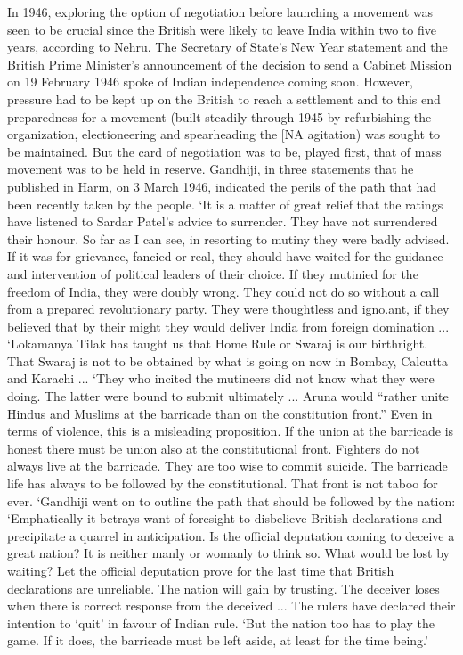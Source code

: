 In 1946, exploring the option of negotiation before launching a movement was seen to be crucial since the British were likely to leave India within two to five years, according to Nehru. The Secretary of State's New Year statement and the British Prime Minister's announcement of the decision to send a Cabinet Mission on 19 February 1946 spoke of Indian independence coming soon. However, pressure had to be kept up on the British to reach a settlement and to this end preparedness for a movement (built steadily through 1945 by refurbishing the organization, electioneering and spearheading the [NA agitation) was sought to be maintained. But the card of negotiation was to be, played first, that of mass movement was to be held in reserve. Gandhiji, in three statements that he published in Harm, on 3 March 1946, indicated the perils of the path that had been recently taken by the people. `It is a matter of great relief that the ratings have listened to Sardar Patel's advice to surrender. They have not surrendered their honour. So far as I can see, in resorting to mutiny they were badly advised. If it was for grievance, fancied or real, they should have waited for the guidance and intervention of political leaders of their choice. If they mutinied for the freedom of India, they were doubly wrong. They could not do so without a call from a prepared revolutionary party. They were thoughtless and igno.ant, if they believed that by their might they would deliver India from foreign domination ... `Lokamanya Tilak has taught us that Home Rule or Swaraj is our birthright. That Swaraj is not to be obtained by what is going on now in Bombay, Calcutta and Karachi ... `They who incited the mutineers did not know what they were doing. The latter were bound to submit ultimately ... Aruna would ``rather unite Hindus and Muslims at the barricade than on the constitution front.'' Even in terms of violence, this is a misleading proposition. If the union at the barricade is honest there must be union also at the constitutional front. Fighters do not always live at the barricade. They are too wise to commit suicide. The barricade life has always to be followed by the constitutional. That front is not taboo for ever. `Gandhiji went on to outline the path that should be followed by the nation: `Emphatically it betrays want of foresight to disbelieve British declarations and precipitate a quarrel in anticipation. Is the official deputation coming to deceive a great nation? It is neither manly or womanly to think so. What would be lost by waiting? Let the official deputation prove for the last time that British declarations are unreliable. The nation will gain by trusting. The deceiver loses when there is correct response from the deceived ... The rulers have declared their intention to `quit' in favour of Indian rule. `But the nation too has to play the game. If it does, the barricade must be left aside, at least for the time being.'
